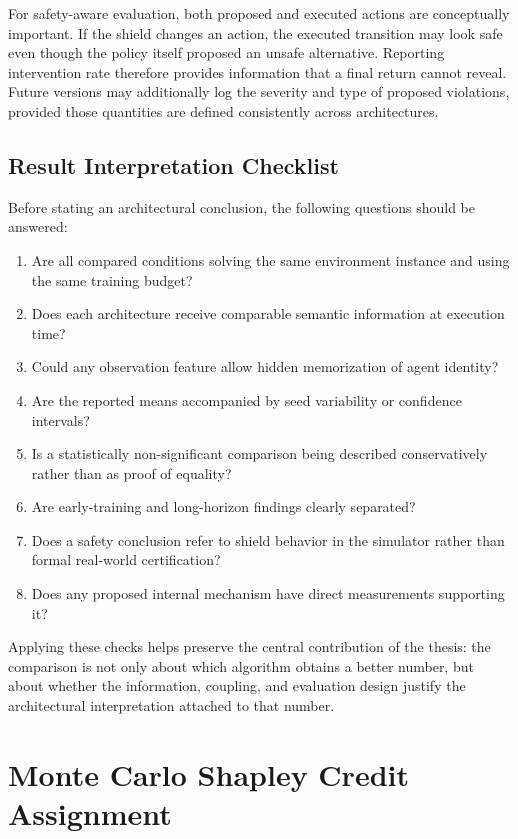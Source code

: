 \documentclass{iutbscthesis}
\begin{document}
\begin{appendices}
For safety-aware evaluation, both proposed and executed actions are conceptually important. If the shield changes an action, the executed transition may look safe even though the policy itself proposed an unsafe alternative. Reporting intervention rate therefore provides information that a final return cannot reveal. Future versions may additionally log the severity and type of proposed violations, provided those quantities are defined consistently across architectures.

\section{Result Interpretation Checklist}
Before stating an architectural conclusion, the following questions should be answered:
\begin{enumerate}[leftmargin=*]
    \item Are all compared conditions solving the same environment instance and using the same training budget?
    \item Does each architecture receive comparable semantic information at execution time?
    \item Could any observation feature allow hidden memorization of agent identity?
    \item Are the reported means accompanied by seed variability or confidence intervals?
    \item Is a statistically non-significant comparison being described conservatively rather than as proof of equality?
    \item Are early-training and long-horizon findings clearly separated?
    \item Does a safety conclusion refer to shield behavior in the simulator rather than formal real-world certification?
    \item Does any proposed internal mechanism have direct measurements supporting it?
\end{enumerate}

Applying these checks helps preserve the central contribution of the thesis: the comparison is not only about which algorithm obtains a better number, but about whether the information, coupling, and evaluation design justify the architectural interpretation attached to that number.

\chapter{Monte Carlo Shapley Credit Assignment}


\end{appendices}
\end{document}
